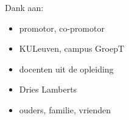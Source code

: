 Dank aan:
\begin{itemize}
\item promotor, co-promotor 
\item KULeuven, campus GroepT
\item docenten uit de opleiding
\item Dries Lamberts
\item ouders, familie, vrienden
\end{itemize}